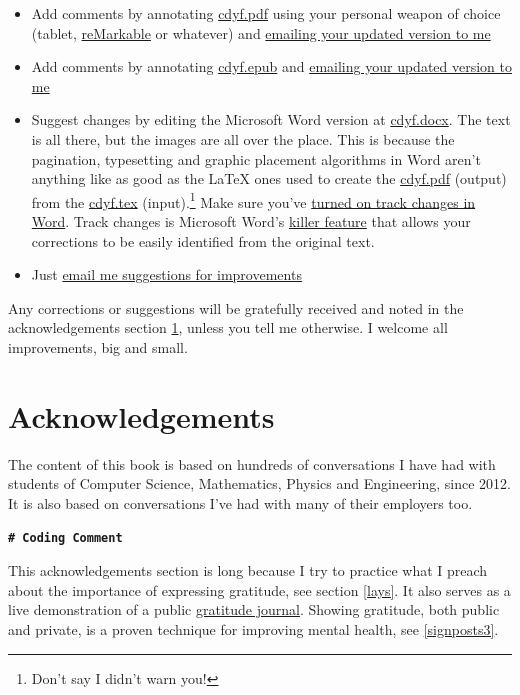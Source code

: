 \documentclass[
]{book}
\providecommand{\tightlist}{%
  \setlength{\itemsep}{0pt}\setlength{\parskip}{0pt}}
\begin{document}
\begin{itemize}
\tightlist
\item
  Add comments by annotating \href{https://www.cdyf.me/cdyf.pdf}{cdyf.pdf} using your personal weapon of choice (tablet, \href{https://en.wikipedia.org/wiki/ReMarkable}{reMarkable} or whatever) and \href{http://www.cs.man.ac.uk/~hulld/contact.html}{emailing your updated version to me}
\item
  Add comments by annotating \href{https://www.cdyf.me/cdyf.epub}{cdyf.epub} and \href{http://www.cs.man.ac.uk/~hulld/contact.html}{emailing your updated version to me}
\item
  Suggest changes by editing the Microsoft Word version at \href{http://cdyf.me/cdyf.docx}{cdyf.docx}. The text is all there, but the images are all over the place. This is because the pagination, typesetting and graphic placement algorithms in Word aren't anything like as good as the LaTeX ones used to create the \href{https://www.cdyf.me/cdyf.pdf}{cdyf.pdf} (output) from the \href{https://cdyf.me/cdyf.tex}{cdyf.tex} (input).\footnote{Don't say I didn't warn you!} Make sure you've \href{https://support.microsoft.com/en-us/office/track-changes-in-word-197ba630-0f5f-4a8e-9a77-3712475e806a}{turned on track changes in Word}. Track changes is Microsoft Word's \href{https://en.wikipedia.org/wiki/Killer_feature}{killer feature} that allows your corrections to be easily identified from the original text.
\item
  Just \href{http://www.cs.man.ac.uk/~hulld/contact.html}{email me suggestions for improvements}
\end{itemize}

Any corrections or suggestions will be gratefully received and noted in the acknowledgements section \ref{thanks}, unless you tell me otherwise. I welcome all improvements, big and small.

\hypertarget{thanks}{%
\section{Acknowledgements}\label{thanks}}

The content of this book is based on hundreds of conversations I have had with students of Computer Science, Mathematics, Physics and Engineering, since 2012. It is also based on conversations I've had with many of their employers too.

\textbf{\texttt{\#\ Coding\ Comment}}

This acknowledgements section is long because I try to practice what I preach about the importance of expressing gratitude, see section \ref{lays}. It also serves as a live demonstration of a public \href{https://en.wikipedia.org/wiki/Gratitude_journal}{gratitude journal}. Showing gratitude, both public and private, is a proven technique for improving mental health, see \ref{signposts3}.
\end{document}
